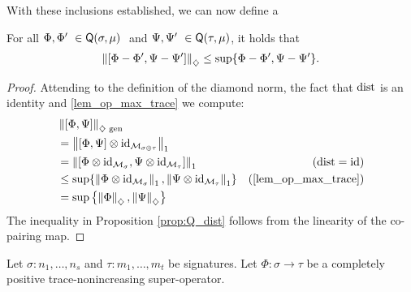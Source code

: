 With these inclusions established, we can now define a 

\begin{proposition} \label{prop:Q_dist}
  For all $\Phi, \Phi' \in \catQ(\sigma,\mu)  $ and $\Psi, \Psi' \in \catQ(\tau,\mu) $, it holds that
  $$ \left\lVert [\Phi-\Phi',\Psi-\Psi'] \right\rVert_{\diamondsuit} \leq \sup\{\Phi-\Phi',  \Psi-\Psi' \}.$$
\end{proposition}

\begin{proof}
  Attending to the definition of the diamond norm, the fact that $\mathrm{dist}$ is an identity  and \autoref{lem_op_max_trace} we compute:
    \begin{align*}
      & \gendiamondnorm{[\Phi, \Psi]} \\
      &= \tracenorm{[\Phi, \Psi] \otimes \id_{\SqMatrix{\sigma\oplus\tau}}} \\
      &= \tracenorm{[\Phi \otimes \id_{\SqMatrix{\sigma}}, \Psi \otimes \id_{\SqMatrix{\tau}}]}& (\dist=\id) \\
      & \leq  \sup \{ \tracenorm{\Phi \otimes \id_{\SqMatrix{\sigma}}}, \tracenorm{\Psi \otimes \id_{\SqMatrix{\tau}} }\} & (\text{\autoref{lem_op_max_trace}})\\
      & = \sup \left\{ \diamondnorm{\Phi}, \diamondnorm{\Psi} \right\}
    \end{align*}
The inequality in Proposition \ref{prop:Q_dist} follows from the linearity of the co-pairing map.
\end{proof}


  \begin{corollary} \label{cor:gen_diamond_cptp_norm}
    Let $\sigma: n_1, \ldots, n_s$ and  $\tau: m_1, \ldots, m_t$  be signatures. Let  $\Phi: \sigma  \rightarrow \tau$ be a  completely positive trace-nonincreasing super-operator. 
  \end{corollary}
 

